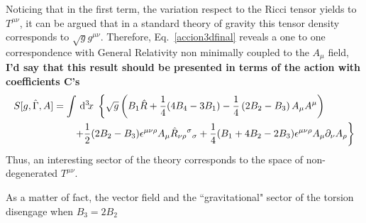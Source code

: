 \documentclass[%
  showpacs,showkeys,prd,superscriptaddress]{revtex4-1}
\def\l{\left}
\def\r{\right}
\newcommand{\hl}[1]{{\color{red} \textbf{#1}}}
\begin{document}


Noticing that in  the first term, the variation respect to the Ricci tensor yields to $T^{\mu\nu}$, it can be argued that in a standard theory of gravity this tensor density corresponds to $\sqrt{g}g^{\mu\nu}$.
Therefore, Eq.~\eqref{accion3dfinal} reveals a one to one correspondence with General Relativity non minimally coupled to the $A_\mu$ field, \hl{I'd say that this result should be presented in terms of the action with coefficients C's}
\begin{equation}
  \label{accion3dGR}
  \begin{split}
    S[g,\hat\Gamma,A]&=
    \int\dn{3}{x} \l\{\sqrt{g}\l(B_1\hat R +\frac{1}{4}(4B_4-3B_1) -\frac{1}{4}\l( 2B_2-B_3\r) A_\mu A^\mu\r)\r.\\
    & \qquad \l.+\frac{1}{2}(2B_2-B_3)\epsilon^{\mu\nu\rho}A_\mu\hat R_{\nu\rho}{}^{\sigma}{}_\sigma+\frac{1}{4}(B_1+4B_2-2B_3)\epsilon^{\mu\nu\rho}A_\mu\partial_\nu A_\rho\r\}
  \end{split}
\end{equation}
Thus, an interesting sector of the theory corresponds to the space of non-degenerated $T^{\mu\nu}$. 

As a matter of fact, the vector field and the ``gravitational" sector of the torsion disengage when $B_3=2B_2$
\end{document}
